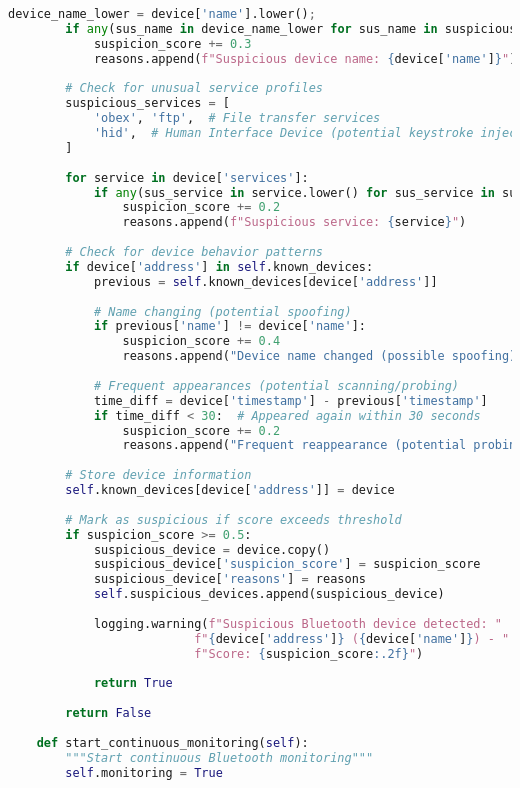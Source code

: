 \documentclass[12pt,a4paper]{report}
\begin{document}
\begin{lstlisting}[language=Python, caption=Bluetooth Attack Detection System]
        device_name_lower = device['name'].lower();
        if any(sus_name in device_name_lower for sus_name in suspicious_names):
            suspicion_score += 0.3
            reasons.append(f"Suspicious device name: {device['name']}")
        
        # Check for unusual service profiles
        suspicious_services = [
            'obex', 'ftp',  # File transfer services
            'hid',  # Human Interface Device (potential keystroke injection)
        ]
        
        for service in device['services']:
            if any(sus_service in service.lower() for sus_service in suspicious_services):
                suspicion_score += 0.2
                reasons.append(f"Suspicious service: {service}")
        
        # Check for device behavior patterns
        if device['address'] in self.known_devices:
            previous = self.known_devices[device['address']]
            
            # Name changing (potential spoofing)
            if previous['name'] != device['name']:
                suspicion_score += 0.4
                reasons.append("Device name changed (possible spoofing)")
            
            # Frequent appearances (potential scanning/probing)
            time_diff = device['timestamp'] - previous['timestamp']
            if time_diff < 30:  # Appeared again within 30 seconds
                suspicion_score += 0.2
                reasons.append("Frequent reappearance (potential probing)")
        
        # Store device information
        self.known_devices[device['address']] = device
        
        # Mark as suspicious if score exceeds threshold
        if suspicion_score >= 0.5:
            suspicious_device = device.copy()
            suspicious_device['suspicion_score'] = suspicion_score
            suspicious_device['reasons'] = reasons
            self.suspicious_devices.append(suspicious_device)
            
            logging.warning(f"Suspicious Bluetooth device detected: "
                          f"{device['address']} ({device['name']}) - "
                          f"Score: {suspicion_score:.2f}")
            
            return True
        
        return False
    
    def start_continuous_monitoring(self):
        """Start continuous Bluetooth monitoring"""
        self.monitoring = True
        

\end{lstlisting}
\end{document}
